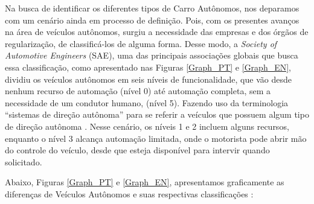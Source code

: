 Na busca de identificar os diferentes tipos de Carro Autônomos, nos deparamos com um cenário ainda em processo de definição. Pois, com os presentes avanços na área de veículos autônomos, surgiu a necessidade das empresas e dos órgãos de regularização, de classificá-los de alguma forma. Desse modo, a \textit{Society of Automotive Engineers} (SAE), uma das principais associações globais que busca essa classificação, como apresentado nas Figuras \ref{Graph_PT} e \ref{Graph_EN}, dividiu os veículos autônomos em seis níveis de funcionalidade, que vão desde nenhum recurso de automação (nível 0) até automação completa, sem a necessidade de um condutor humano, (nível 5). Fazendo uso da terminologia “sistemas de direção autônoma” para se referir a veículos que possuem algum tipo de direção autônoma \cite{SAE}. Nesse cenário, os níveis 1 e 2 incluem alguns recursos, enquanto o nível 3 alcança automação limitada, onde o motorista pode abrir mão do controle do veículo, desde que esteja disponível para intervir quando solicitado.

Abaixo, Figuras \ref{Graph_PT} e \ref{Graph_EN}, apresentamos graficamente as diferenças de Veículos Autônomos e suas respectivas classificações \cite{SAE}:

